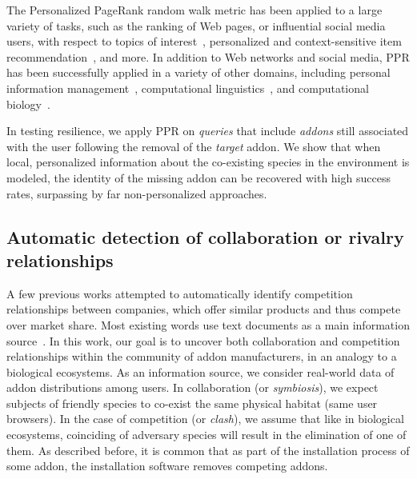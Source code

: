 \documentclass[ijoc,nonblindrev]{informs3} %
\numberwithin{equation}{subsection}
\begin{document}
The Personalized PageRank random walk metric has been applied to a large variety of tasks, such as the ranking of Web pages, or influential social media users, with respect to topics of interest~\citep{haveliwala2003topic,weng2010twitterrank}, personalized and context-sensitive item  recommendation~\citep{lee2011random,bagciKAIS16}, and more. In addition to Web networks and social media, PPR has been successfully applied in a variety of other domains, including personal information management~\citep{minkov2010improving}, computational linguistics~\citep{agirreEACL09}, and computational biology~\citep{freschi2007protein}.

In testing resilience, we apply PPR on {\it queries} that include {\it addons} still associated with the user following the removal of the {\it target} addon. We show that when local, personalized information about the co-existing species in the environment is modeled, the identity of the missing addon can be recovered with high success rates, surpassing by far non-personalized approaches. 

\subsection{Automatic detection of collaboration or rivalry relationships}

A few previous works attempted to automatically identify competition relationships between companies, which offer similar products and thus compete over market share. Most existing words use text documents as a main information source~\citep{baoTKDE08,yangCIKM12}. In this work, our goal is to uncover both collaboration and competition relationships within the community of addon manufacturers, in an analogy to a biological ecosystems. As an information source, we consider real-world data of addon distributions among users. In collaboration (or \emph{symbiosis}), we expect subjects of friendly species to co-exist the same physical habitat (same user browsers). In the case of competition (or \emph{clash}), we assume that like in biological ecosystems, coinciding of adversary species will result in the elimination of one of them. As described before, it is common that as part of the installation process of some addon, the installation software removes competing addons. 
\end{document}
